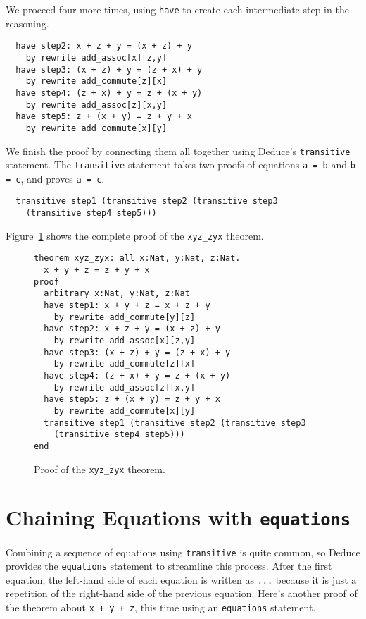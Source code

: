\documentclass[12pt]{article}
\begin{document}
We proceed four more times, using \texttt{have} to create each
intermediate step in the reasoning.

\begin{verbatim}
  have step2: x + z + y = (x + z) + y
    by rewrite add_assoc[x][z,y]
  have step3: (x + z) + y = (z + x) + y
    by rewrite add_commute[z][x]
  have step4: (z + x) + y = z + (x + y)
    by rewrite add_assoc[z][x,y]
  have step5: z + (x + y) = z + y + x
    by rewrite add_commute[x][y]
\end{verbatim}

We finish the proof by connecting them all together using Deduce's
\texttt{transitive} statement. The \texttt{transitive} statement takes
two proofs of equations \texttt{a = b} and \texttt{b = c}, and proves
\texttt{a = c}.

\begin{verbatim}
  transitive step1 (transitive step2 (transitive step3
    (transitive step4 step5)))
\end{verbatim}

Figure~\ref{fig:xyz-theorem} shows the complete proof of the
\texttt{xyz\_zyx} theorem.

\begin{figure}[tbp]
\begin{verbatim}
theorem xyz_zyx: all x:Nat, y:Nat, z:Nat.
  x + y + z = z + y + x
proof
  arbitrary x:Nat, y:Nat, z:Nat
  have step1: x + y + z = x + z + y
    by rewrite add_commute[y][z]
  have step2: x + z + y = (x + z) + y
    by rewrite add_assoc[x][z,y]
  have step3: (x + z) + y = (z + x) + y
    by rewrite add_commute[z][x]
  have step4: (z + x) + y = z + (x + y)
    by rewrite add_assoc[z][x,y]
  have step5: z + (x + y) = z + y + x
    by rewrite add_commute[x][y]
  transitive step1 (transitive step2 (transitive step3
    (transitive step4 step5)))
end
\end{verbatim}
\caption{Proof of the \texttt{xyz\_zyx} theorem.}
\label{fig:xyz-theorem}
\end{figure}

\clearpage

\section{Chaining Equations with \texttt{equations}}

Combining a sequence of equations using \texttt{transitive} is quite
common, so Deduce provides the \texttt{equations} statement to
streamline this process.  After the first equation, the left-hand side
of each equation is written as \texttt{...} because it is just a
repetition of the right-hand side of the previous equation. Here's
another proof of the theorem about \texttt{x + y + z}, this time using
an \texttt{equations} statement.
\end{document}
